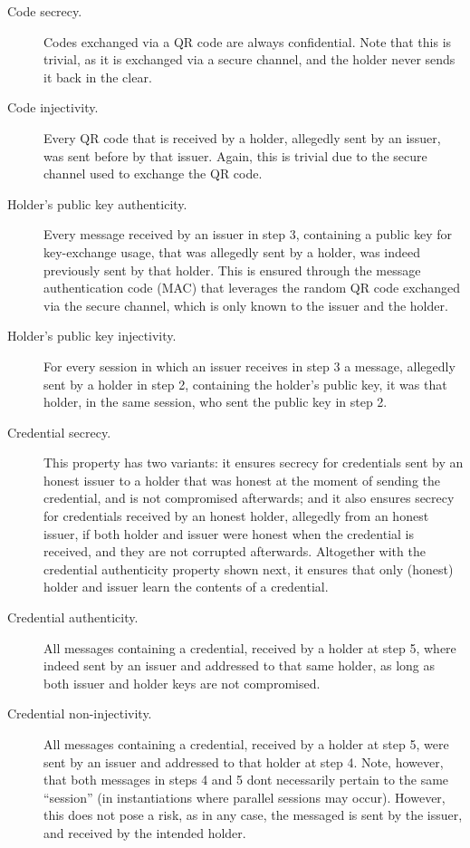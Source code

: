 \documentclass[10pt,a4paper]{article}
\begin{document}
\begin{description}
\item[Code secrecy.] Codes exchanged via a QR code are always confidential.
  Note that this is trivial, as it is exchanged via a secure channel, and
  the holder never sends it back in the clear.
\item[Code injectivity.] Every QR code that is received by a holder, allegedly
  sent by an issuer, was sent before by that issuer. Again, this is trivial due
  to the secure channel used to exchange the QR code.
\item[Holder's public key authenticity.] Every message received by an issuer
  in step 3, containing a public key for key-exchange usage, that was
  allegedly sent by a holder, was indeed previously sent by that holder.
  This is ensured through the message authentication code (MAC) that
  leverages the random QR code exchanged via the secure channel, which is
  only known to the issuer and the holder.
\item[Holder's public key injectivity.] For every session in which an
  issuer receives in step 3 a message, allegedly sent by a holder in
  step 2, containing the holder's public key, it was that holder, in
  the same session, who sent the public key in step 2.  
\item[Credential secrecy.] This property has two variants: it ensures
  secrecy for credentials sent by an honest issuer to a holder that was honest
  at the moment of sending the credential, and is not compromised afterwards;
  and it also ensures secrecy for credentials received by an honest holder,
  allegedly from an honest issuer, if both holder and issuer were honest when
  the credential is received, and they are not corrupted afterwards. Altogether
  with the credential authenticity property shown next, it ensures that only
  (honest) holder and issuer learn the contents of a credential.
\item[Credential authenticity.] All messages containing a credential, received
  by a holder at step 5, where indeed sent by an issuer and addressed to that
  same holder, as long as both issuer and holder keys are not compromised.
\item[Credential non-injectivity.] All messages containing a credential, received
  by a holder at step 5, were sent by an issuer and addressed to that holder
  at step 4. Note, however, that both messages in steps 4 and 5 dont necessarily
  pertain to the  same ``session'' (in instantiations where parallel sessions
  may occur). However, this does not pose a risk, as in any case, the messaged
  is sent by the issuer, and received by the intended holder.
\end{description}
\end{document}
